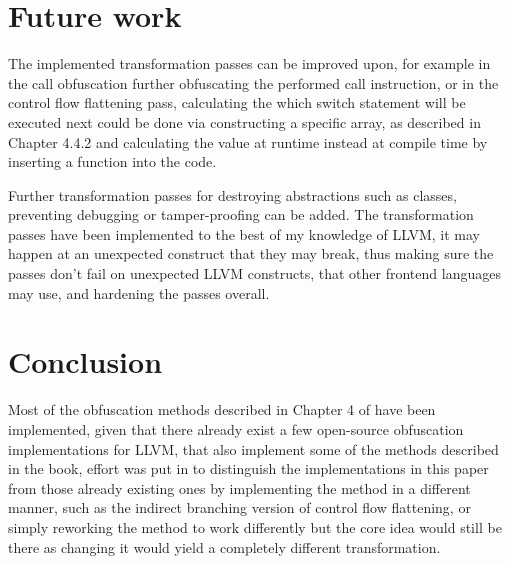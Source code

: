 \section{Future work}

The implemented transformation passes can be improved upon, for example in the call obfuscation further obfuscating
the performed call instruction, or in the control flow flattening pass, calculating the which switch statement will be executed
next could be done via constructing a specific array, as described in Chapter 4.4.2 \cite{ss-chpt4} and calculating the value at runtime instead at compile time by
inserting a function into the code.

Further transformation passes for destroying abstractions such as classes, preventing debugging or tamper-proofing can be added.
The transformation passes have been implemented to the best of my knowledge of LLVM, it may happen at an unexpected construct that they may break, thus
making sure the passes don't fail on unexpected LLVM constructs, that other frontend languages may use, and hardening the passes overall.

\section{Conclusion}
Most of the obfuscation methods described in Chapter 4 of \cite{serr-soft} have been implemented, given that there already exist a few open-source obfuscation implementations
for LLVM, that also implement some of the methods described in the book, effort was put in to distinguish the implementations in this paper from those already existing ones
by implementing the method in a different manner, such as the indirect branching version of control flow flattening, or simply reworking the method to work differently but the
core idea would still be there as changing it would yield a completely different transformation.


